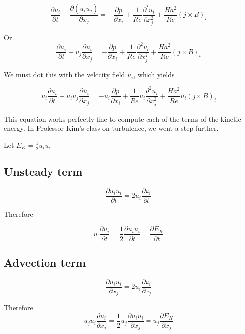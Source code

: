 \documentclass[11pt]{article}
\newcommand{\PD}{\partial}
\begin{document}
\begin{equation}
	\frac{\PD u_i}{\PD t} + 
	\frac{\PD (u_i u_j)}{\PD x_j}
	= 
	- \frac{\PD p}{\PD x_i}
	+ \frac{1}{Re}
	\frac{\PD^2 u_i}{\PD x_j^2}
	+ \frac{Ha^2}{Re}
	(j \times B)_i
\end{equation}

Or
\begin{equation}
	\frac{\PD u_i}{\PD t} + 
	u_j\frac{\PD u_i}{\PD x_j}
	= 
	- \frac{\PD p}{\PD x_i}
	+ \frac{1}{Re}
	\frac{\PD^2 u_i}{\PD x_j^2}
	+ \frac{Ha^2}{Re}
	(j \times B)_i
\end{equation}


We must dot this with the velocity field $u_i$, which yields

\begin{equation}
	\boxed{
	u_i
	\frac{\PD u_i}{\PD t} + 
	u_i
	u_j\frac{\PD u_i}{\PD x_j}
	= 
	- u_i
	\frac{\PD p}{\PD x_i}
	+ \frac{1}{Re}
	u_i
	\frac{\PD^2 u_i}{\PD x_j^2}
	+ \frac{Ha^2}{Re}
	u_i
	(j \times B)_i
	}
\end{equation}

This equation works perfectly fine to compute each of the terms of the kinetic energy. In Professor Kim's class on turbulence, we went a step further.

Let $E_K = \frac{1}{2} u_i u_i$

\subsection{Unsteady term}
\begin{equation}
	\frac{\PD u_i u_i}{\PD t}
	=
	2 u_i \frac{\PD u_i}{\PD t}
\end{equation}

Therefore

\begin{equation}
	u_i \frac{\PD u_i}{\PD t}
	=
	\frac{1}{2} \frac{\PD u_i u_i}{\PD t}
	=
	\frac{\PD E_K}{\PD t}
\end{equation}

\subsection{Advection term}
\begin{equation}
	\frac{\PD u_i u_i}{\PD x_j}
	=
	2 u_i \frac{\PD u_i}{\PD x_j}
\end{equation}

Therefore
\begin{equation}
	u_j u_i \frac{\PD u_i}{\PD x_j}
	=
	\frac{1}{2} u_j \frac{\PD u_i u_i}{\PD x_j}
	=
	u_j \frac{\PD E_K}{\PD x_j}
\end{equation}
\end{document}
